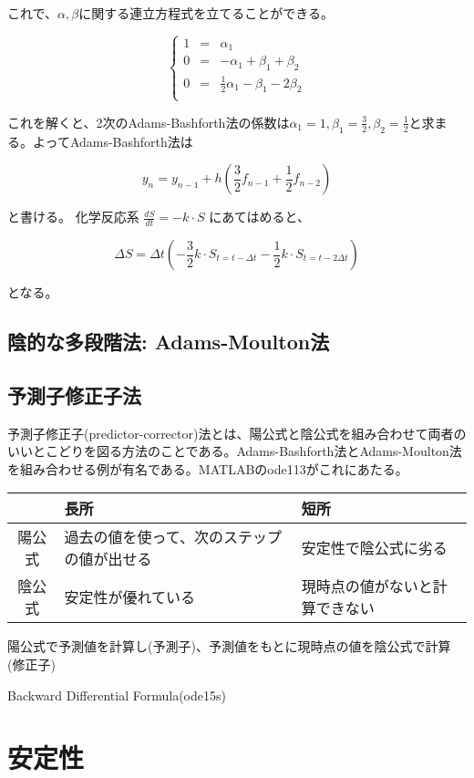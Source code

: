 これで、\(\alpha, \beta\)に関する連立方程式を立てることができる。

\[
\left\{
\begin{array}{lcl}
1 & = & \alpha_1 \\
0 & = & - \alpha_1 + \beta_1 + \beta_2 \\
0 & = & \frac{1}{2} \alpha_1 - \beta_1 -2 \beta_2 \\
\end{array}
\right.
\]

これを解くと、2次のAdams-Bashforth法の係数は\(\alpha_1 = 1, \beta_1 = \frac{3}{2}, \beta_2 = \frac{1}{2}\)と求まる。よってAdams-Bashforth法は

\[ y_n = y_{n-1} + h \left( \frac{3}{2} f_{n-1} + \frac{1}{2} f_{n-2}\right)\]

と書ける。
化学反応系 \(\displaystyle\frac{dS}{dt} = -k \cdot S\) にあてはめると、

\[\Delta S = \Delta t \left( - \frac{3}{2} k \cdot S_{t=t-\Delta t} - \frac{1}{2} k \cdot S_{t=t-2\Delta t}\right)\]

となる。


\subsection{陰的な多段階法: Adams-Moulton法}

\subsection{予測子修正子法}
予測子修正子(predictor-corrector)法とは、陽公式と陰公式を組み合わせて両者のいいとこどりを図る方法のことである。Adams-Bashforth法とAdams-Moulton法を組み合わせる例が有名である。MATLABのode113がこれにあたる。

\begin{tabular}{c||l|l}
      & 長所 & 短所 \\
\hline
陽公式 & 過去の値を使って、次のステップの値が出せる & 安定性で陰公式に劣る\\
陰公式 & 安定性が優れている & 現時点の値がないと計算できない \\
\end{tabular}

陽公式で予測値を計算し(予測子)、予測値をもとに現時点の値を陰公式で計算(修正子)

Backward Differential Formula(ode15s)

\section{安定性}
